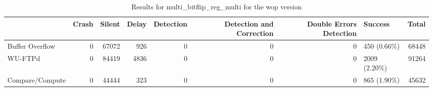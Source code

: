 \begin{table}[t]
	\centering
	\caption{Results for multi_bitflip_reg_multi for the wop version}
	\label{table:end_sim_by_status_wop_1_multi_bitflip_reg_multi}
	\begin{tabular}{lrrrrrrlr}
		\toprule
		                & Crash & Silent & Delay & Detection & Detection and Correction & Double Errors Detection & Success       & Total \\
		\midrule
		Buffer Overflow & 0     & 67072  & 926   & 0         & 0                        & 0                       & 450 (0.66\%)  & 68448 \\
		WU-FTPd         & 0     & 84419  & 4836  & 0         & 0                        & 0                       & 2009 (2.20\%) & 91264 \\
		Compare/Compute & 0     & 44444  & 323   & 0         & 0                        & 0                       & 865 (1.90\%)  & 45632 \\
		\bottomrule
	\end{tabular}
\end{table}
